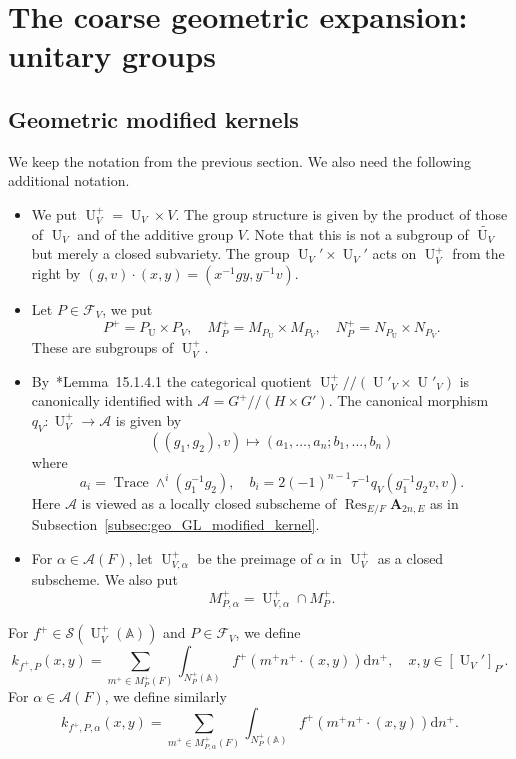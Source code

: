 \documentclass[letterpaper,11pt]{amsart}
\newcommand{\bA}{\mathbb{A}}
\newcommand{\cA}{\mathcal{A}}
\newcommand{\cF}{\mathcal{F}}
\newcommand{\cS}{\mathcal{S}}
\newcommand{\rd}{\mathrm{d}}
\newcommand{\<}{\negthickspace}
\DeclareMathOperator{\Trace}{Trace}
\DeclareMathOperator{\U}{U}
\DeclareMathOperator{\Res}{Res}
\theoremstyle{definition}
\theoremstyle{plain}
\theoremstyle{remark}
\numberwithin{equation}{section}
\begin{document}
\section{The coarse geometric expansion: unitary groups}
\label{sec:geo_U}

\subsection{Geometric modified kernels}
We keep the notation from the previous section. We also need the following
additional notation.

\begin{itemize}
\item We put $\U_V^+ = \U_V \times V$. The group structure is given by the
    product of those of $\U_V$ and of the additive group $V$. Note that this is not a subgroup
    of $\widetilde{\U_V}$ but merely a closed subvariety.
    The group $\U_V' \times \U_V'$
    acts on $\U_V^+$ from the right by $(g, v) \cdot (x, y) = (x^{-1} g y, y^{-1} v)$.

\item Let $P  \in \cF_V$, we put
        \[
        P^+ = P_{\U} \times P_V, \quad
        M_P^+ = M_{P_{\U}} \times M_{P_V}, \quad
        N_P^+ = N_{P_{\U}} \times N_{P_V} .
        \]
    These are subgroups of $\U_V^+$.


\item By~\cite{CZ}*{Lemma~15.1.4.1} the categorical quotient $\U_V^+//(\U'_V \times \U'_V)$ is canonically identified with $\cA = G^+//(H \times G')$. The canonical morphism $q_V: \U_V^+ \to \cA$ is given by
        \[
        ((g_1, g_2), v) \mapsto (a_1, \hdots, a_n; b_1, \hdots, b_n)
        \]
    where
        \[
        a_i = \Trace \wedge^i (g_1^{-1} g_2), \quad
        b_i = 2 (-1)^{n-1} \tau^{-1} q_V( g_1^{-1} g_2 v, v).
        \]
    Here $\cA$ is viewed as a locally closed subscheme of $\Res_{E/F} \mathbf{A}_{2n, E}$ as in Subsection~\ref{subsec:geo_GL_modified_kernel}.

\item For $\alpha \in \cA(F)$, let $\U^+_{V, \alpha}$ be the preimage of $\alpha$ in
    $\U^+_V$ as a closed subscheme. We also put
        \[
        M^+_{P, \alpha} = \U^+_{V, \alpha} \cap M^+_P.
        \]
\end{itemize}



For $f^+ \in \cS(\U_V^+(\bA))$ and $P \in \cF_V$, we define
    \[
    k_{f^+,P}(x,y) = \sum_{m^+ \in M_P^+(F)}
    \int_{N_P^+(\bA)} f^+(m^+ n^+ \cdot (x,y)) \rd n^+, \quad
    x, y \in [\U_V']_{P'}.
    \]
For $\alpha \in \cA(F)$, we define similarly
    \[
    k_{f^+,P,\alpha}(x,y) = \sum_{m^+ \in M_{P,\alpha}^{+}(F)}
    \int_{N_P^+(\bA)} f^+(m^+ n^+ \cdot (x,y)) \rd n^+.
    \]
\end{document}
